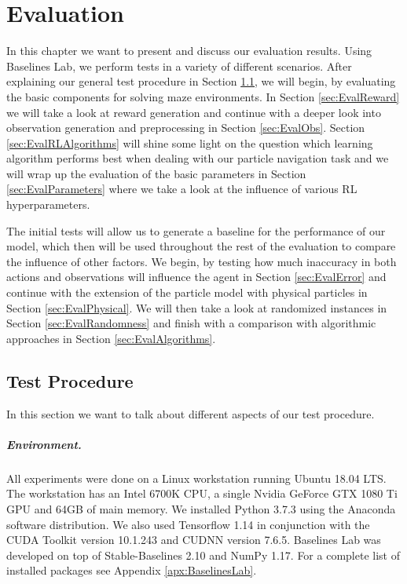 \chapter{Evaluation} \label{chp:Evaluation}
In this chapter we want to present and discuss our evaluation results. Using Baselines Lab, we perform tests in a variety of different scenarios. After explaining our general test procedure in Section \ref{sec:TestProcedure}, we will begin, by evaluating the basic components for solving maze environments. In Section \ref{sec:EvalReward} we will take a look at reward generation and continue with a deeper look into observation generation and preprocessing in Section \ref{sec:EvalObs}. Section \ref{sec:EvalRLAlgorithms} will shine some light on the question which learning algorithm performs best when dealing with our particle navigation task and we will wrap up the evaluation of the basic parameters in Section \ref{sec:EvalParameters} where we take a look at the influence of various RL hyperparameters.

The initial tests will allow us to generate a baseline for the performance of our model, which then will be used throughout the rest of the evaluation to compare the influence of other factors. We begin, by testing how much inaccuracy in both actions and observations will influence the agent in Section \ref{sec:EvalError} and continue with the extension of the particle model with physical particles in Section \ref{sec:EvalPhysical}. We will then take a look at randomized instances in Section \ref{sec:EvalRandomness} and finish with a comparison with algorithmic approaches in Section \ref{sec:EvalAlgorithms}.


\section{Test Procedure} \label{sec:TestProcedure}
In this section we want to talk about different aspects of our test procedure.

\paragraph{Environment.}
All experiments were done on a Linux workstation running Ubuntu 18.04 LTS. The workstation has an Intel 6700K CPU, a single Nvidia GeForce GTX 1080 Ti GPU and 64GB of main memory. We installed Python 3.7.3 using the Anaconda \cite{anaconda} software distribution. We also used Tensorflow 1.14 in conjunction with the CUDA Toolkit version 10.1.243 and CUDNN version 7.6.5. Baselines Lab was developed on top of Stable-Baselines 2.10 and NumPy 1.17. For a complete list of installed packages see Appendix \ref{apx:BaselinesLab}.

